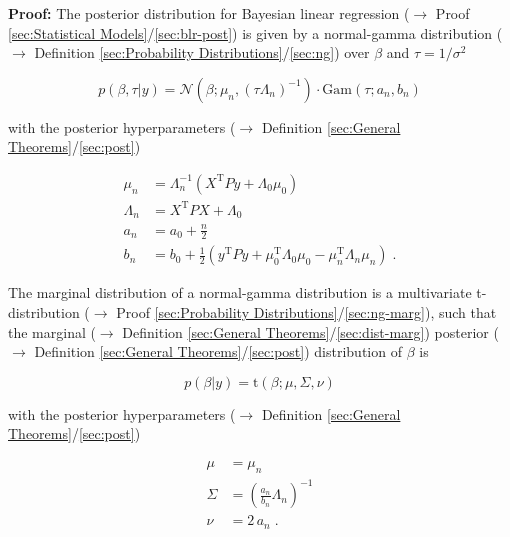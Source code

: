 \documentclass[a4paper,12pt,twoside]{book}
\begin{document}
\vspace{1em}
\textbf{Proof:} The posterior distribution for Bayesian linear regression ($\rightarrow$ Proof \ref{sec:Statistical Models}/\ref{sec:blr-post}) is given by a normal-gamma distribution ($\rightarrow$ Definition \ref{sec:Probability Distributions}/\ref{sec:ng}) over $\beta$ and $\tau = 1/\sigma^2$

\begin{equation} \label{eq:blr-pcr-GLM-NG-post}
p(\beta,\tau|y) = \mathcal{N}(\beta; \mu_n, (\tau \Lambda_n)^{-1}) \cdot \mathrm{Gam}(\tau; a_n, b_n)
\end{equation}

with the posterior hyperparameters ($\rightarrow$ Definition \ref{sec:General Theorems}/\ref{sec:post})

\begin{equation} \label{eq:blr-pcr-GLM-NG-post-par}
\begin{split}
\mu_n &= \Lambda_n^{-1} (X^\mathrm{T} P y + \Lambda_0 \mu_0) \\
\Lambda_n &= X^\mathrm{T} P X + \Lambda_0 \\
a_n &= a_0 + \frac{n}{2} \\
b_n &= b_0 + \frac{1}{2} (y^\mathrm{T} P y + \mu_0^\mathrm{T} \Lambda_0 \mu_0 - \mu_n^\mathrm{T} \Lambda_n \mu_n) \; .
\end{split}
\end{equation}

The marginal distribution of a normal-gamma distribution is a multivariate t-distribution ($\rightarrow$ Proof \ref{sec:Probability Distributions}/\ref{sec:ng-marg}), such that the marginal ($\rightarrow$ Definition \ref{sec:General Theorems}/\ref{sec:dist-marg}) posterior ($\rightarrow$ Definition \ref{sec:General Theorems}/\ref{sec:post}) distribution of $\beta$ is

\begin{equation} \label{eq:blr-pcr-GLM-NG-post-beta}
p(\beta|y) = \mathrm{t}(\beta; \mu, \Sigma, \nu)
\end{equation}

with the posterior hyperparameters ($\rightarrow$ Definition \ref{sec:General Theorems}/\ref{sec:post})

\begin{equation} \label{eq:blr-pcr-GLM-NG-post-par-beta}
\begin{split}
\mu &= \mu_n \\
\Sigma &= \left( \frac{a_n}{b_n} \Lambda_n \right)^{-1} \\
\nu &= 2 \, a_n \; .
\end{split}
\end{equation}
\end{document}
